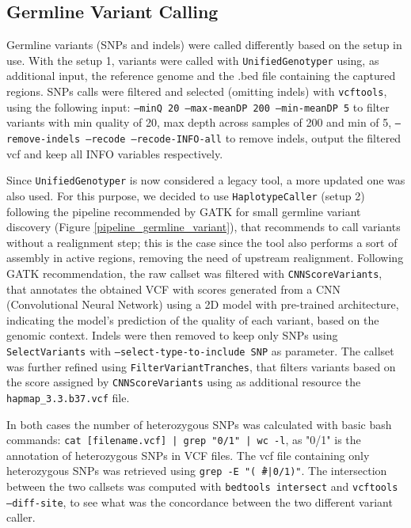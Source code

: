 \documentclass[11pt]{article}
\begin{document}
\subsection*{Germline Variant Calling}

Germline variants (SNPs and indels) were called differently based on the setup in use. With the setup 1, variants were called with \texttt{UnifiedGenotyper} using, as additional input, the reference genome and the .bed file containing the captured regions. SNPs calls were filtered and selected (omitting indels) with \texttt{vcftools}, using the following input: \texttt{--minQ 20 --max-meanDP 200 --min-meanDP 5} to filter variants with min quality of 20, max depth across samples of 200 and min of 5, \texttt{--remove-indels --recode --recode-INFO-all} to remove indels, output the filtered vcf and keep all INFO variables respectively. 

Since \texttt{UnifiedGenotyper} is now considered a legacy tool, a more updated one was also used. For this purpose, we decided to use \texttt{HaplotypeCaller} (setup 2) following the pipeline recommended by GATK for small germline variant discovery (Figure \ref{pipeline_germline_variant}), that recommends to call variants without a realignment step; this is the case since the tool also performs a sort of assembly in active regions, removing the need of upstream realignment. Following GATK recommendation, the raw callset was filtered with \texttt{CNNScoreVariants}, that annotates the obtained VCF with scores generated from a CNN (Convolutional Neural Network) using a 2D model with pre-trained architecture, indicating the model's prediction of the quality of each variant, based on the genomic context. Indels were then removed to keep only SNPs using \texttt{SelectVariants} with \texttt{--select-type-to-include SNP} as parameter. The callset was further refined using \texttt{FilterVariantTranches}, that filters variants based on the score assigned by \texttt{CNNScoreVariants} using as additional resource the \texttt{hapmap\_3.3.b37.vcf} file.

In both cases the number of heterozygous SNPs was calculated with basic bash commands: \texttt{cat [filename.vcf] | grep "0/1" | wc -l}, as "0/1" is the annotation of heterozygous SNPs in VCF files. The vcf file containing only heterozygous SNPs was retrieved using \texttt{grep -E "(\^\ \#|0/1)"}.
The intersection between the two callsets was computed with \texttt{bedtools intersect} and \texttt{vcftools --diff-site}, to see what was the concordance between the two different variant caller.
\end{document}
